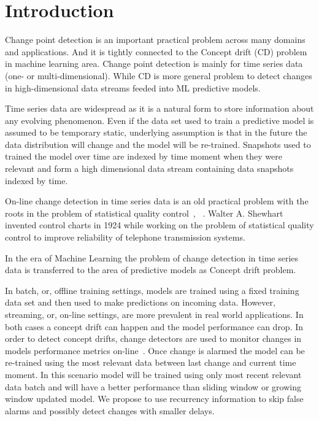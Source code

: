 \chapter{Introduction}

Change point detection is an important practical problem across many domains and applications.
And it is tightly connected to the Concept drift (CD) problem in machine learning area.
Change point detection is mainly for time series data (one- or multi-dimensional).
While CD is more general problem to detect changes in high-dimensional data streams feeded into ML predictive models.

Time series data are widespread as it is a natural form to store information about any evolving phenomenon.
Even if the data set used to train a predictive model is assumed to be temporary static, underlying assumption is that in the future the data distribution will change and the model will be re-trained. Snapshots used to trained the model over time are indexed by time moment when they were relevant and form a high dimensional data stream containing data snapshots indexed by time.

On-line change detection in time series data is an old practical problem with the roots in the problem of statistical quality control~\cite{basseville1993detection}, ~\cite{NISTbook}. Walter A. Shewhart invented control charts in 1924 while working on the problem of statistical quality control to improve reliability of telephone transmission systems.

In the era of Machine Learning the problem of change detection in time series data is transferred to the area of predictive models as Concept drift problem.

In batch, or, offline training settings, models are trained using a fixed training data set and then used to make predictions on incoming data. 
However, streaming, or, on-line settings, are more prevalent in real world applications. 
In both cases a concept drift can happen and the model performance can drop. 
In order to detect concept drifts, change detectors are used to monitor changes in models performance metrics on-line~\cite{gama2004learning}. 
Once change is alarmed the model can be re-trained using the most relevant data between last change and current time moment.
In this scenario model will be trained using only most recent relevant data batch and will have a better performance than sliding window or growing window updated model.
We propose to use recurrency information to skip false alarms and possibly detect changes with smaller delays.

